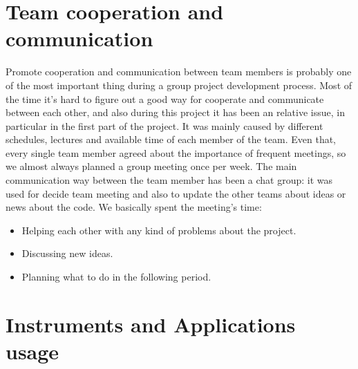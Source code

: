 \section{Team cooperation and communication}
\vspace{-5mm}
Promote cooperation and communication between team members is probably one of the most important thing during a group project development process. Most of the time it's hard to figure out a good way for cooperate and communicate between each other, and also during this project it has been an relative issue, in particular in the first part of the project. It was mainly caused by different schedules, lectures and available time of each member of the team.
Even that, every single team member agreed about the importance of frequent meetings, so we almost always planned a group meeting once per week. 
The main communication way between the team member has been a chat group: it was used for decide team meeting and also to update the other teams about ideas or news about the code.
We basically spent the meeting's time:
\vspace{-5mm}
\begin{itemize}
 \setlength{\itemsep}{-5pt}
 \item Helping each other with any kind of problems about the project.
 \item Discussing new ideas.
 \item Planning what to do in the following period.
\end{itemize} 
\vspace{-5mm}

\section{Instruments and Applications usage}
\vspace{-5mm}
